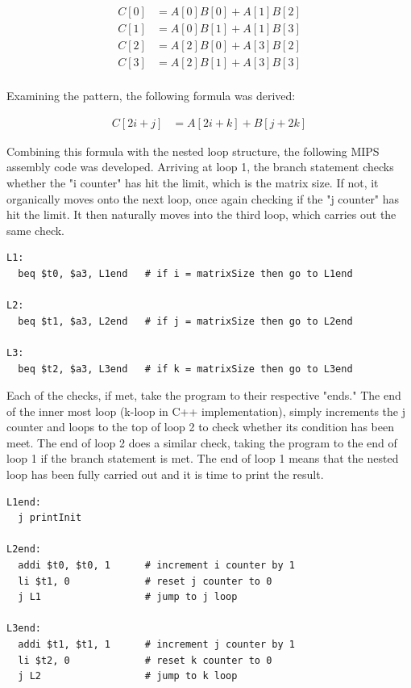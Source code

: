 \documentclass[twocolumn]{article}
\begin{document}
\begin{equation}
    \begin{split}
        C[0] & = A[0]B[0] + A[1]B[2] \\
        C[1] & = A[0]B[1] + A[1]B[3] \\
        C[2] & = A[2]B[0] + A[3]B[2] \\
        C[3] & = A[2]B[1] + A[3]B[3] \\
    \end{split}
\end{equation}

Examining the pattern, the following formula was derived: 

\begin{equation}
    \begin{split}
        C[2i+j] &= A[2i+k] + B[j+2k]
    \end{split}
\end{equation}

Combining this formula with the nested loop structure, the following MIPS assembly code was developed. Arriving at loop 1, the branch statement checks whether the "i counter" has hit the limit, which is the matrix size. If not, it organically moves onto the next loop, once again checking if the "j counter" has hit the limit. It then naturally moves into the third loop, which carries out the same check. 

\begin{verbatim}
L1:
  beq $t0, $a3, L1end   # if i = matrixSize then go to L1end
  
L2:
  beq $t1, $a3, L2end   # if j = matrixSize then go to L2end
  
L3:
  beq $t2, $a3, L3end   # if k = matrixSize then go to L3end
\end{verbatim}

Each of the checks, if met, take the program to their respective "ends." The end of the inner most loop (k-loop in C++ implementation), simply increments the j counter and loops to the top of loop 2 to check whether its condition has been meet. The end of loop 2 does a similar check, taking the program to the end of loop 1 if the branch statement is met. The end of loop 1 means that the nested loop has been fully carried out and it is time to print the result. 

\begin{verbatim}
L1end:
  j printInit
  
L2end:
  addi $t0, $t0, 1      # increment i counter by 1
  li $t1, 0             # reset j counter to 0
  j L1                  # jump to j loop
  
L3end:
  addi $t1, $t1, 1      # increment j counter by 1
  li $t2, 0             # reset k counter to 0
  j L2                  # jump to k loop
\end{verbatim}
\end{document}

